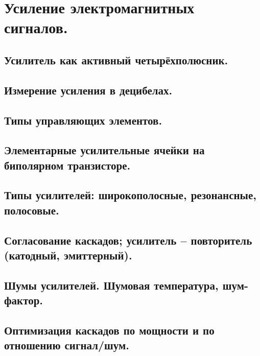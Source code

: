 \documentclass[../main/main.tex]{subfiles}
\begin{document}
\section{Усиление электромагнитных сигналов.}

\subsection{Усилитель как активный четырёхполюсник.}

\subsection{Измерение усиления в децибелах.}

\subsection{Типы управляющих элементов.}

\subsection{Элементарные усилительные ячейки на биполярном транзисторе.}

\subsection{Типы усилителей: широкополосные, резонансные, полосовые.}

\subsection{Согласование каскадов; усилитель -- повторитель (катодный, эмиттерный).}

\subsection{Шумы усилителей. Шумовая температура, шум-фактор.}

\subsection{Оптимизация каскадов по мощности и по отношению сигнал/шум.}
\end{document}
